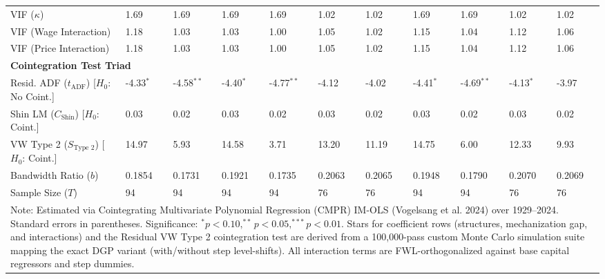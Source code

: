 \begin{table}[H]
\begin{tabular}{p{3.5cm}p{1.0cm}p{1.0cm}p{1.0cm}p{1.0cm}p{1.0cm}p{1.0cm}p{1.0cm}p{1.0cm}p{1.0cm}p{1.0cm}}
VIF ($\kappa$) & 1.69 & 1.69 & 1.69 & 1.69 & 1.02 & 1.02 & 1.69 & 1.69 & 1.02 & 1.02 \\
VIF (Wage Interaction) & 1.18 & 1.03 & 1.03 & 1.00 & 1.05 & 1.02 & 1.15 & 1.04 & 1.12 & 1.06 \\
VIF (Price Interaction) & 1.18 & 1.03 & 1.03 & 1.00 & 1.05 & 1.02 & 1.15 & 1.04 & 1.12 & 1.06 \\
\midrule
\multicolumn{11}{l}{\textbf{Cointegration Test Triad}} \\
Resid. ADF ($t_{\text{ADF}}$) [$H_0$: No Coint.] & -4.33$^{*}$ & -4.58$^{**}$ & -4.40$^{*}$ & -4.77$^{**}$ & -4.12 & -4.02 & -4.41$^{*}$ & -4.69$^{**}$ & -4.13$^{*}$ & -3.97 \\
Shin LM ($C_{\text{Shin}}$) [$H_0$: Coint.] & 0.03 & 0.02 & 0.03 & 0.02 & 0.03 & 0.02 & 0.03 & 0.02 & 0.03 & 0.02 \\
VW Type 2 ($S_{\text{Type 2}}$) [$H_0$: Coint.] & 14.97 & 5.93 & 14.58 & 3.71 & 13.20 & 11.19 & 14.75 & 6.00 & 12.33 & 9.93 \\
\midrule
Bandwidth Ratio ($b$) & 0.1854 & 0.1731 & 0.1921 & 0.1735 & 0.2063 & 0.2065 & 0.1948 & 0.1790 & 0.2070 & 0.2069 \\
Sample Size ($T$) & 94 & 94 & 94 & 94 & 76 & 76 & 94 & 94 & 76 & 76 \\
\bottomrule
\multicolumn{11}{p{15cm}}{\footnotesize Note: Estimated via Cointegrating Multivariate Polynomial Regression (CMPR) IM-OLS (Vogelsang et al. 2024) over 1929--2024. Standard errors in parentheses. Significance: $^* p < 0.10, ^{**} p < 0.05, ^{***} p < 0.01$. Stars for coefficient rows (structures, mechanization gap, and interactions) and the Residual VW Type 2 cointegration test are derived from a 100,000-pass custom Monte Carlo simulation suite mapping the exact DGP variant (with/without step level-shifts). All interaction terms are FWL-orthogonalized against base capital regressors and step dummies.}
\end{tabular}
\end{table}
